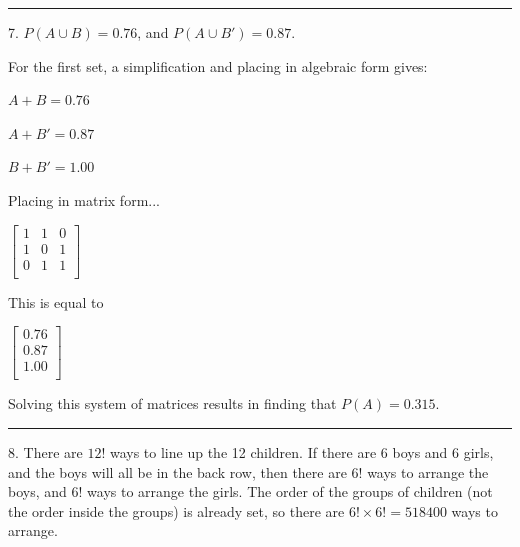 \documentclass{article}
\begin{document}
\noindent\rule{8cm}{0.4pt}

7. $P(A\cup B) = 0.76$, and $P(A\cup B') = 0.87$. 

For the first set, a simplification and placing in algebraic form gives:

$A + B = 0.76$

$A + B' = 0.87$

$B + B' = 1.00$

Placing in matrix form... 

$
\begin{bmatrix}
	1 & 1 & 0 \\
	1 & 0 & 1 \\
	0 & 1 & 1 \\
\end{bmatrix}
$

This is equal to 

$
\begin{bmatrix}
0.76  \\
0.87  \\
1.00  \\
\end{bmatrix}
$

Solving this system of matrices results in finding that $P(A) = 0.315$. 


\noindent\rule{8cm}{0.4pt}


8. There are $\boxed{12!}$ ways to line up the 12 children. If there are 6 boys and 6 girls, and the boys will all be in the back row, then there are $6!$ ways to arrange the boys, and $6!$ ways to arrange the girls. The order of the groups of children (not the order inside the groups) is already set, so there are $6! \times 6! = \boxed{518400}$ ways to arrange. 




























 
\end{document}
